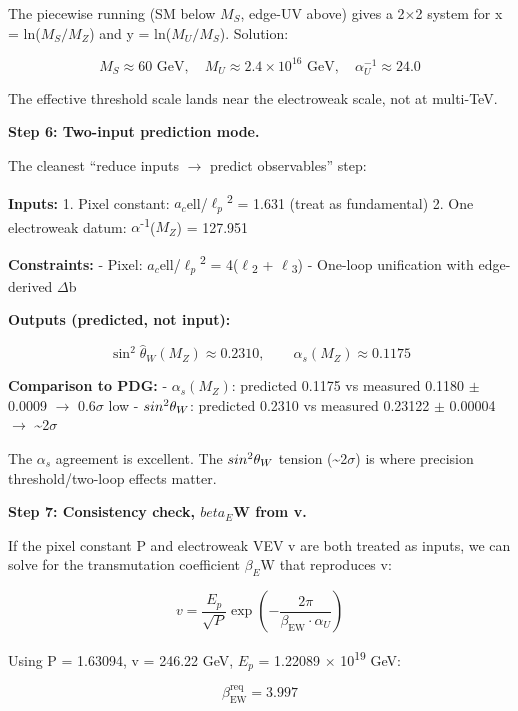 \documentclass[11pt,a4paper]{article}
\theoremstyle{remark}
\begin{document}
The piecewise running (SM below \(M_S\), edge-UV above) gives a 2\ensuremath{\times}2 system for x = ln(\(M_S/M_Z\)) and y = ln(\(M_U/M_S\)). Solution:

\[
M_S \approx 60 \text{ GeV}, \quad M_U \approx 2.4 \times 10^{16} \text{ GeV}, \quad \alpha_U^{-1} \approx 24.0
\]

The effective threshold scale lands near the electroweak scale, not at multi-TeV.

\textbf{Step 6: Two-input prediction mode.}

The cleanest ``reduce inputs \ensuremath{\to} predict observables'' step:

\textbf{Inputs:}
1. Pixel constant: \(a_c\)ell/\(\ensuremath{\ell}_p\)\textsuperscript{2} = 1.631 (treat as fundamental)
2. One electroweak datum: \ensuremath{\alpha}\textsuperscript{-1}(\(M_Z\)) = 127.951

\textbf{Constraints:}
- Pixel: \(a_c\)ell/\(\ensuremath{\ell}_p\)\textsuperscript{2} = 4(\ensuremath{\ell}\textsubscript{2} + \ensuremath{\ell}\textsubscript{3})
- One-loop unification with edge-derived \ensuremath{\Delta}b

\textbf{Outputs (predicted, not input):}

\[
\sin^2\hat{\theta}_W(M_Z) \approx 0.2310, \qquad \alpha_s(M_Z) \approx 0.1175
\]

\textbf{Comparison to PDG:}
- \(\ensuremath{\alpha}_s(M_Z)\): predicted 0.1175 vs measured 0.1180 \ensuremath{\pm} 0.0009 \ensuremath{\to} 0.6\ensuremath{\sigma} low
- \(sin\textsuperscript{2}\ensuremath{\theta}_W\): predicted 0.2310 vs measured 0.23122 \ensuremath{\pm} 0.00004 \ensuremath{\to} \textasciitilde2\ensuremath{\sigma}

The \(\ensuremath{\alpha}_s\) agreement is excellent. The \(sin\textsuperscript{2}\ensuremath{\theta}_W\) tension (\textasciitilde2\ensuremath{\sigma}) is where precision threshold/two-loop effects matter.

\textbf{Step 7: Consistency check, \(beta_E\)W from v.}

If the pixel constant P and electroweak VEV v are both treated as inputs, we can solve for the transmutation coefficient \(\ensuremath{\beta}_E\)W that reproduces v:

\[
v = \frac{E_p}{\sqrt{P}} \exp\left(-\frac{2\pi}{\beta_\mathrm{EW} \cdot \alpha_U}\right)
\]

Using P = 1.63094, v = 246.22 GeV, \(E_p\) = 1.22089 \ensuremath{\times} 10\textsuperscript{19} GeV:

\[
\beta_\mathrm{EW}^\mathrm{req} = 3.997
\]
\end{document}
